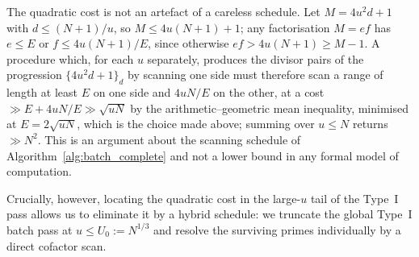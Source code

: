\documentclass[11pt, a4paper]{article}
\theoremstyle{plain}
\theoremstyle{definition}
\begin{document}
The quadratic cost is not an artefact of a careless schedule. Let $M=4u^{2}d+1$ with $d\le(N+1)/u$, so $M\le 4u(N+1)+1$; any factorisation $M=ef$ has $e\le E$ or $f\le 4u(N+1)/E$, since otherwise $ef>4u(N+1)\ge M-1$. A procedure which, for each $u$ separately, produces the divisor pairs of the progression $\{4u^{2}d+1\}_{d}$ by scanning one side must therefore scan a range of length at least $E$ on one side and $4uN/E$ on the other, at a cost $\gg E+4uN/E\gg\sqrt{uN}$ by the arithmetic--geometric mean inequality, minimised at $E=2\sqrt{uN}$, which is the choice made above; summing over $u\le N$ returns $\gg N^{2}$. This is an argument about the scanning schedule of Algorithm~\ref{alg:batch_complete} and not a lower bound in any formal model of computation.

Crucially, however, locating the quadratic cost in the large-$u$ tail of the Type~I pass allows us to eliminate it by a hybrid schedule: we truncate the global Type~I batch pass at $u\le U_0:=N^{1/3}$ and resolve the surviving primes individually by a direct cofactor scan.
\end{document}
